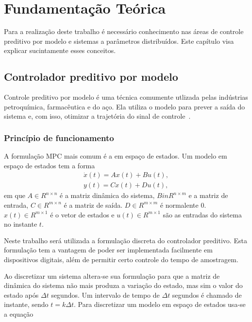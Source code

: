 
\chapter{Fundamentação Teórica}%
\label{chp:foundations}

Para a realização deste trabalho é necessário conhecimento nas áreas de controle
preditivo por modelo e sistemas a parâmetros distribuídos. Este capítulo visa
explicar sucintamente esses conceitos.

\section{Controlador preditivo por modelo}%
\label{sec:mpc}

Controle preditivo por modelo é uma técnica comumente utlizada pelas indústrias
petroquímica, farmacêutica e do aço. Ela utiliza o modelo para prever a saída do
sistema e, com isso, otimizar a trajetória do sinal de
controle~\cite{book:wang}.

\subsection{Princípio de funcionamento}%
\label{subsec:mpc-basic}

A formulação \ac{MPC} mais comum é a em espaço de estados. Um modelo em espaço
de estados tem a forma
%
\begin{equation}
	\label{eq:ss}
	\begin{split}
		\dot{x}(t) = A x(t) + B u(t), \\
		y(t) = C x(t) + Du(t),
	\end{split}
\end{equation}
%
em que \( A \in R^{n \times n} \) é a matriz dinâmica do sistema, \( B in R^{n
\times m} \) e a matriz de entrada, \( C \in R^{m \times n} \) é a matriz de
saída. \( D \in R^{m \times m} \) é normalente \( 0 \). \( x(t) \in R^{m \times
1} \) é o vetor de estados e \( u(t) \in R^{m \times 1} \) são as entradas do
sistema no instante \( t \).

Neste trabalho será utilizada a formulação discreta do controlador preditivo.
Esta formulação tem a vantagem de poder ser implementada facilmente em
dispositivos digitais, além de permitir certo controle do tempo de amostragem.

Ao discretizar um sistema altera-se sua formulação para que a matriz de dinâmica
do sistema não mais produza a variação do estado, mas sim o valor do estado após
\( \Delta{}t \) segundos. Um intervalo de tempo de \( \Delta{}t \) segundos é
chamado de instante, sendo \( t = k\Delta{}t \). Para discretizar um modelo em
espaço de estados usa-se a equação

